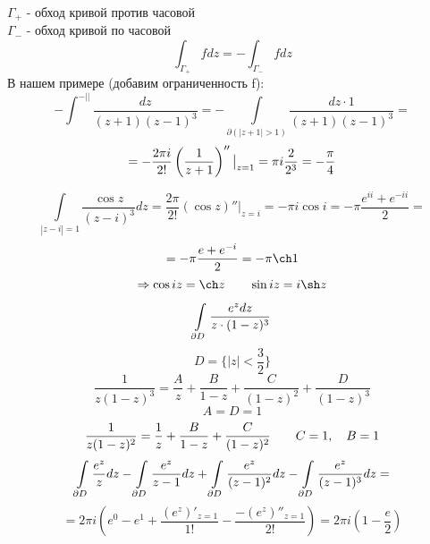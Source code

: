 \documentclass[main]{subfiles}
\begin{document}
		\begin{remark}
				$\Gamma_+$ - обход кривой против часовой\\
				$\Gamma_-$ - обход кривой по часовой
				\[\int_{\Gamma_+} f dz = - \int_{\Gamma_-} f dz\]
				В нашем примере (добавим ограниченность f):
				\[- \int^{-||} \frac{dz}{(z+1)(z-1)^3} = - \int\limits_{\partial(|z+1|>1)} \frac{dz \cdot 1}{(z+1)(z-1)^3} =\]
				\[= - \frac{2\pi i}{2!} \left(\frac{1}{z+1}\right)''\big|_{z=1} = \pi i \frac{2}{2^3} = -\frac{\pi}{4}\]
		\end{remark}

		\begin{Example}
				\[\int\limits_{|z-i|=1} \frac{\cos z}{(z-i)^3} dz = \frac{2\pi}{2!} (\cos z)'' \big|_{z=i} = -\pi i \cos{i} = -\pi \frac{e^{ii} + e^{-ii}}{2} = \]
				\[= - \pi \frac{e + e^{-i}}{2} = -\pi \ch 1\]
				\[\Ra \cos{iz} = \ch z \qq \sin iz = i\sh z\]
		\end{Example}

		\begin{Example}
				\[\int\limits_{\partial D} \frac{e^z dz}{z \cdot (1-z)^3}\]
				\[D = \{|z| < \frac{3}{2}\}\]
				\[\frac{1}{z(1-z)^3} = \frac{A}{z} + \frac{B}{1-z} + \frac{C}{(1-z)^2} + \frac{D}{(1-z)^3}\]
				\[A = D = 1\]
				\[\frac{1}{z(1-z)^2} = \frac{1}{z} + \frac{B}{1 - z} + \frac{C}{(1 - z)^2}\qquad C = 1,\quad B = 1\]
				\[\int\limits_{\partial D} \frac{e^z}{z} dz - \int\limits_{\partial D} \frac{e^z}{z - 1} dz + \int\limits_{\partial D} \frac{e^z}{(z-1)^2} dz - \int\limits_{\partial D} \frac{e^z}{(z - 1)^3} dz =\]
				\[= 2\pi i (e^0 - e^1 + \frac{(e^z)'_{z=1}}{1!} - \frac{-(e^z)''_{z = 1}}{2!}) = 2\pi i (1 - \frac{e}{2})\]
		\end{Example}
\end{document}
